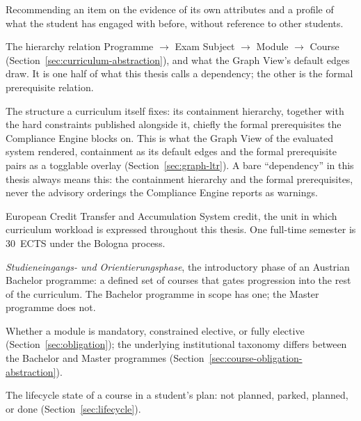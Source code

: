 \begin{description}
  \label{gls:content-based-filtering}
  \item[Content-based filtering] Recommending an item on the evidence of its own attributes and a profile of what the student has engaged with before, without reference to other students.

  \label{gls:containment}
  \item[Containment] The hierarchy relation Programme $\to$ Exam Subject $\to$ Module $\to$ Course (Section~\ref{sec:curriculum-abstraction}), and what the Graph View's default edges draw. It is one half of what this thesis calls a dependency; the other is the formal prerequisite relation.
  \label{gls:dependency}
  \item[Dependency] The structure a curriculum itself fixes: its containment hierarchy, together with the hard constraints published alongside it, chiefly the formal prerequisites the Compliance Engine blocks on. This is what the Graph View of the evaluated system rendered, containment as its default edges and the formal prerequisite pairs as a togglable overlay (Section~\ref{sec:graph-ltr}). A bare \enquote{dependency} in this thesis always means this: the containment hierarchy and the formal prerequisites, never the advisory orderings the Compliance Engine reports as warnings.
  \label{gls:ects}
  \item[ECTS] European Credit Transfer and Accumulation System credit, the unit in which curriculum workload is expressed throughout this thesis. One full-time semester is 30~ECTS under the Bologna process.
  \label{gls:steop}
  \item[StEOP] \emph{Studieneingangs- und Orientierungsphase}, the introductory phase of an Austrian Bachelor programme: a defined set of courses that gates progression into the rest of the curriculum. The Bachelor programme in scope has one; the Master programme does not.
  \label{gls:obligation-category}
  \item[Obligation category / obligation type] Whether a module is mandatory, constrained elective, or fully elective (Section~\ref{sec:obligation}); the underlying institutional taxonomy differs between the Bachelor and Master programmes (Section~\ref{sec:course-obligation-abstraction}).
  \label{gls:planning-status}
  \item[Planning status] The lifecycle state of a course in a student's plan: not planned, parked, planned, or done (Section~\ref{sec:lifecycle}).

\end{description}

